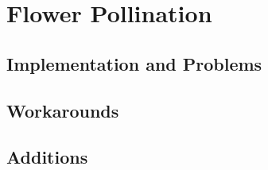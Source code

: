 \section{Flower Pollination}
\subsection{Implementation and Problems}
\subsection{Workarounds}
\subsection{Additions}